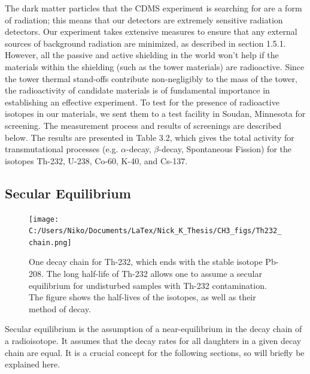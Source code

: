 \documentclass{report}
\begin{document}
The dark matter particles that the CDMS experiment is searching for are a form of radiation; this means that our detectors are extremely sensitive radiation detectors. Our experiment takes extensive measures to ensure that any external sources of background radiation are minimized, as described in section 1.5.1. However, all the passive and active shielding in the world won't help if the materials within the shielding (such as the tower materials) are radioactive. Since the tower thermal stand-offs contribute non-negligibly to the mass of the tower, the radioactivity of candidate materials is of fundamental importance in establishing an effective experiment. To test for the presence of radioactive isotopes in our materials, we sent them to a test facility in Soudan, Minnesota for screening. The measurement process and results of screenings are described below. The results are presented in Table 3.2, which gives the total activity for transmutational processes (e.g. $\alpha$-decay, $\beta$-decay, Spontaneous Fission) for the isotopes Th-232, U-238, Co-60, K-40, and Cs-137.

\subsection{Secular Equilibrium}

\begin{figure}
\centering
\texttt{[image: C:/Users/Niko/Documents/LaTex/Nick\_K\_Thesis/CH3\_figs/Th232\_chain.png]}
\caption{One decay chain for Th-232, which ends with the stable isotope Pb-208. The long half-life of Th-232 allows one to assume a secular equilibrium for undisturbed samples with Th-232 contamination. The figure shows the half-lives of the isotopes, as well as their method of decay.}
\end{figure}

Secular equilibrium is the assumption of a near-equilibrium in the decay chain of a radioisotope. It assumes that the decay rates for all daughters in a given decay chain are equal. It is a crucial concept for the following sections, so will briefly be explained here.
\end{document}
